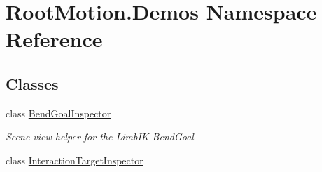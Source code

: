 \hypertarget{namespace_root_motion_1_1_demos}{}\section{Root\+Motion.\+Demos Namespace Reference}
\label{namespace_root_motion_1_1_demos}
\subsection*{Classes}
\begin{DoxyCompactItemize}
\item 
class \mbox{\hyperlink{class_root_motion_1_1_demos_1_1_bend_goal_inspector}{Bend\+Goal\+Inspector}}
\begin{DoxyCompactList}\small\item\em Scene view helper for the Limb\+IK Bend\+Goal \end{DoxyCompactList}\item 
class \mbox{\hyperlink{class_root_motion_1_1_demos_1_1_interaction_target_inspector}{Interaction\+Target\+Inspector}}
\end{DoxyCompactItemize}
